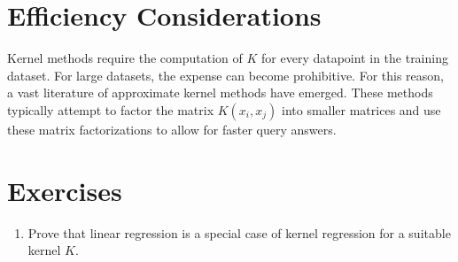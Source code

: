 \documentclass[book.tex]{subfiles}
\begin{document}
\section{Efficiency Considerations}

Kernel methods require the computation of $K$ for every datapoint in the training dataset. For large datasets, the expense can become prohibitive. For this reason, a vast literature of approximate kernel methods have emerged. These methods typically attempt to factor the matrix $K(x_i, x_j)$ into smaller matrices and use these matrix factorizations to allow for faster query answers.

\section{Exercises}
\begin{enumerate}
\item Prove that linear regression is a special case of kernel regression for a suitable kernel $K$.
\end{enumerate}
\end{document}
